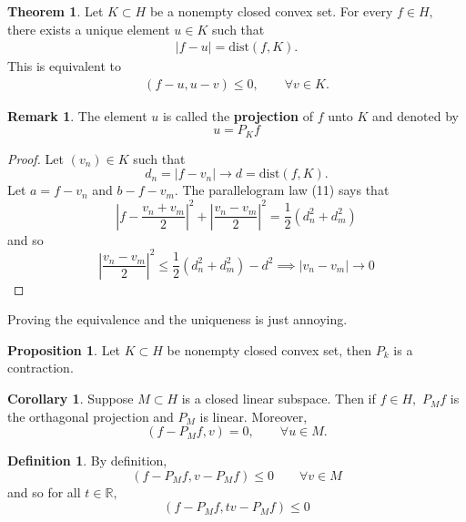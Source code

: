 \documentclass[10pt, oneside]{article}
\newcommand{\bbR}{\mathbb{R}}
\theoremstyle{definition}
\newtheorem{thm}{Theorem}
\newtheorem{defn}{Definition}
\newtheorem{prop}{Proposition}
\newtheorem{rem}{Remark}
\newtheorem{cor}{Corollary}
\begin{document}
\begin{thm}
    Let $K\subset H$ be a nonempty closed convex set. For every $f\in H,$ there exists a unique element $u\in K$ such that 
    \begin{align}
    |f-u| = \text{dist}(f, K).    
    \end{align}
    This is equivalent to 
    \begin{align}
        (f-u, u-v) \leq 0, \qquad \forall v\in K.
    \end{align}
\end{thm}
\begin{rem}
    The element $u$ is called the \textbf{projection} of $f$ unto $K$ and denoted by 
    \[u = P_Kf\]
\end{rem}
\begin{proof}
    Let $(v_n)\in K$ such that 
    \[d_n = |f- v_n| \to d = \text{dist}(f, K).\] Let $a = f - v_n$ and $b- f - v_m.$ The parallelogram law (11) says that 
    \[|f - \frac{v_n + v_m}{2}|^2 + |\frac{v_n - v_m}{2}|^2 = \frac{1}{2}(d_n^2 + d_m^2)\] and so
    \[|\frac{v_n - v_m}{2}|^2 \leq \frac{1}{2}(d_n^2 + d_m^2) - d^2 \implies |v_n - v_m| \to 0\]
\end{proof}
Proving the equivalence and the uniqueness is just annoying.
\begin{prop}
    Let $K\subset H$ be nonempty closed convex set, then $P_k$ is a contraction.
\end{prop}

\begin{cor}
    Suppose $M\subset H$ is a closed linear subspace. Then if $f\in H,$ $P_Mf$ is the orthagonal projection and $P_M$ is linear. Moreover,
    \[(f - P_Mf, v) = 0, \qquad \forall u\in M.\]
\end{cor}
\begin{defn}
    By definition,
    \[(f - P_Mf, v - P_Mf) \leq0 \qquad \forall v\in M\] and so for all $t\in \bbR,$
    \[(f - P_Mf, tv - P_Mf) \leq 0\]
\end{defn}
\end{document}
